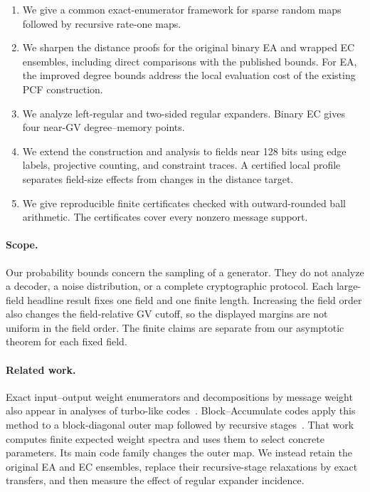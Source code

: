 \begin{enumerate}
  \item We give a common exact-enumerator framework for sparse random maps
  followed by recursive rate-one maps.
  \item We sharpen the distance proofs for the original binary EA and wrapped
  EC ensembles, including direct comparisons with the published bounds.
  For EA, the improved degree bounds address the local evaluation cost of
  the existing PCF construction.
  \item We analyze left-regular and two-sided regular expanders.  Binary EC
  gives four near-GV degree--memory points.
  \item We extend the construction and analysis to fields near 128 bits using
  edge labels, projective counting, and constraint traces.  A certified local
  profile separates field-size effects from changes in the distance target.
  \item We give reproducible finite certificates checked with outward-rounded
  ball arithmetic.  The certificates cover every nonzero message support.
\end{enumerate}

\paragraph{Scope.}
Our probability bounds concern the sampling of a generator.  They do not
analyze a decoder, a noise distribution, or a complete cryptographic
protocol.  Each large-field headline result fixes one field and one finite
length.  Increasing the field order also changes the field-relative GV
cutoff, so the displayed margins are not uniform in the field order.  The
finite claims are separate from our asymptotic theorem for each fixed field.

\paragraph{Related work.}
Exact input--output weight enumerators and decompositions by message weight
also appear in analyses of turbo-like codes~\cite{BazziMahdianSpielman2003}.
Block--Accumulate codes apply this method to a block-diagonal outer map
followed by recursive stages~\cite{BlockAccumulate2026}.  That work computes
finite expected weight spectra and uses them to select concrete parameters.
Its main code family changes the outer map.  We instead retain the original
EA and EC ensembles, replace their recursive-stage relaxations by exact
transfers, and then measure the effect of regular expander incidence.

